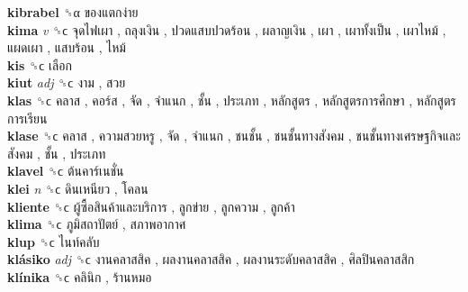 \textbf{kibrabel} ␝α   ของแตกง่าย   \\
\textbf{kima} \emph{v}  ␝ϲ   จุดไฟเผา ,  ถลุงเงิน ,  ปวดแสบปวดร้อน ,  ผลาญเงิน ,  เผา ,  เผาทั้งเป็น ,  เผาไหม้ ,  แผดเผา ,  แสบร้อน ,  ไหม้   \\
\textbf{kis} ␝ϲ   เลือก   \\
\textbf{kiut} \emph{adj}  ␝ϲ   งาม ,  สวย   \\
\textbf{klas} ␝ϲ   คลาส ,  คอร์ส ,  จัด ,  จำแนก ,  ชั้น ,  ประเภท ,  หลักสูตร ,  หลักสูตรการศึกษา ,  หลักสูตรการเรียน   \\
\textbf{klase} ␝ϲ   คลาส ,  ความสวยหรู ,  จัด ,  จำแนก ,  ชนชั้น ,  ชนชั้นทางสังคม ,  ชนชั้นทางเศรษฐกิจและสังคม ,  ชั้น ,  ประเภท   \\
\textbf{klavel} ␝ϲ   ต้นคาร์เนชั่น   \\
\textbf{klei} \emph{n}  ␝ϲ   ดินเหนียว ,  โคลน   \\
\textbf{kliente} ␝ϲ   ผู้ซื้อสินค้าและบริการ ,  ลูกข่าย ,  ลูกความ ,  ลูกค้า   \\
\textbf{klima} ␝ϲ   ภูมิสถาปัตย์ ,  สภาพอากาศ   \\
\textbf{klup} ␝ϲ   ไนท์คลับ   \\
\textbf{klásiko} \emph{adj}  ␝ϲ   งานคลาสสิค ,  ผลงานคลาสสิค ,  ผลงานระดับคลาสสิค ,  ศิลปินคลาสสิก   \\
\textbf{klínika} ␝ϲ   คลินิก ,  ร้านหมอ   \\
